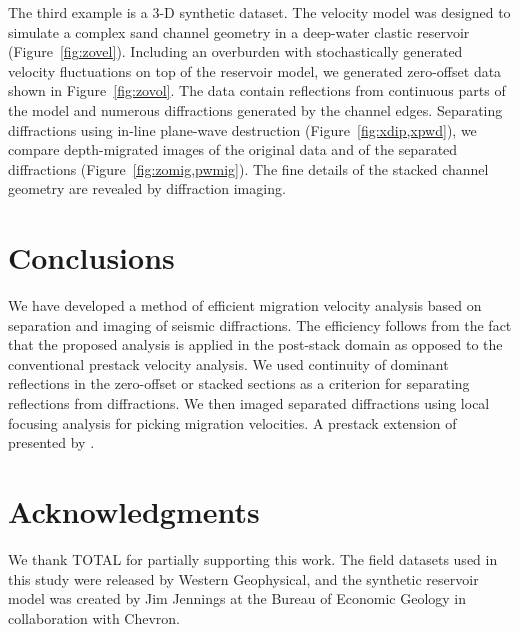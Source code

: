 The third example is a 3-D synthetic dataset. The velocity model was
designed to simulate a complex sand channel geometry in a deep-water
clastic reservoir (Figure~\ref{fig:zovel}).  Including an overburden
with stochastically generated velocity fluctuations on top of the
reservoir model, we generated zero-offset data shown in
Figure~\ref{fig:zovol}. The data contain reflections from continuous
parts of the model and numerous diffractions generated by the channel
edges. Separating diffractions using in-line plane-wave destruction
(Figure~\ref{fig:xdip,xpwd}), we compare depth-migrated images of the
original data and of the separated diffractions
(Figure~\ref{fig:zomig,pwmig}). The fine details of the stacked
channel geometry are revealed by diffraction imaging.

\section{Conclusions}

We have developed a method of efficient migration velocity analysis
based on separation and imaging of seismic diffractions. The
efficiency follows from the fact that the proposed analysis is applied
in the post-stack domain as opposed to the conventional prestack
velocity analysis.  We used continuity of dominant reflections in the
zero-offset or stacked sections as a criterion for separating
reflections from diffractions. We then imaged separated diffractions
using local focusing analysis for picking  
migration velocities. A prestack extension of 
 presented by \cite{tury}.

\begin{comment}
The examples included in this abstract are from 2-D datasets. However,
the method is fully applicable in 3-D, where it can be regarded as an
alternative to coherence cube attributes. We plan to include 3-D
examples in the presentation and describe, in a companion paper
\cite[]{tury}, an extension of diffraction separation to prestack data
analysis.
\end{comment}

\section{Acknowledgments}

We thank TOTAL for partially supporting this work. The field datasets
used in this study were released by Western Geophysical, and the
synthetic reservoir model was created by Jim Jennings at the Bureau of
Economic Geology in collaboration with Chevron. 



